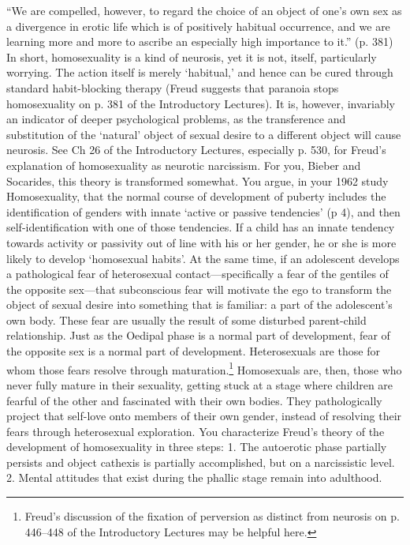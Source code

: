 “We are compelled, however, to regard the choice of an object of one's own sex as a divergence in erotic life which is of positively habitual occurrence, and we are learning more and more to ascribe an especially high importance to it.” (p. 381)
In short, homosexuality is a kind of neurosis, yet it is not, itself, particularly worrying. The action itself is merely `habitual,' and hence can be cured through standard habit-blocking therapy (Freud suggests that paranoia stops homosexuality on p. 381 of the Introductory Lectures). It is, however, invariably an indicator of deeper psychological problems, as the transference and substitution of the `natural' object of sexual desire to a different object will cause neurosis. See Ch 26 of the Introductory Lectures, especially p. 530, for Freud's explanation of homosexuality as neurotic narcissism.
For you, Bieber and Socarides, this theory is transformed somewhat. You argue, in your 1962 study Homosexuality, that the normal course of development of puberty includes the identification of genders with innate `active or passive tendencies' (p 4), and then self-identification with one of those tendencies. If a child has an innate tendency towards activity or passivity out of line with his or her gender, he or she is more likely to develop `homosexual habits'.
At the same time, if an adolescent develops a pathological fear of heterosexual contact—specifically a fear of the gentiles of the opposite sex—that subconscious fear will motivate the ego to transform the object of sexual desire into something that is familiar: a part of the adolescent's own body. These fear are usually the result of some disturbed parent-child relationship. Just as the Oedipal phase is a normal part of development, fear of the opposite sex is a normal part of development. Heterosexuals are those for whom those fears resolve through maturation.\footnote{Freud's discussion of the fixation of perversion as distinct from neurosis on p. 446--448 of the Introductory Lectures may be helpful here.}
Homosexuals are, then, those who never fully mature in their sexuality, getting stuck at a stage where children are fearful of the other and fascinated with their own bodies. They pathologically project that self-love onto members of their own gender, instead of resolving their fears through heterosexual exploration.
You characterize Freud's theory of the development of homosexuality in three steps:
1. The autoerotic phase partially persists and object cathexis is partially accomplished, but on a narcissistic level.
2. Mental attitudes that exist during the phallic stage remain into adulthood.

